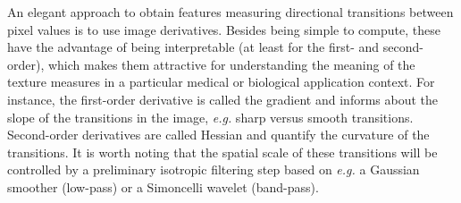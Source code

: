 \documentclass[fleqn,a4paper,oneside,openany]{book}
\begin{document}
An elegant approach to obtain features measuring directional transitions between pixel values is to use image derivatives. 
Besides being simple to compute, these have the advantage of being interpretable (at least for the first- and second-order), which makes them attractive for understanding the meaning of the texture measures in a particular medical or biological application context. 
For instance, the first-order derivative is called the gradient and informs about the slope of the transitions in the image, \emph{e.g.} sharp versus smooth transitions.
Second-order derivatives are called Hessian and quantify the curvature of the transitions.
It is worth noting that the spatial scale of these transitions will be controlled by a preliminary isotropic filtering step based on \emph{e.g.} a Gaussian smoother (low-pass) or a Simoncelli wavelet (band-pass). 
\end{document}
